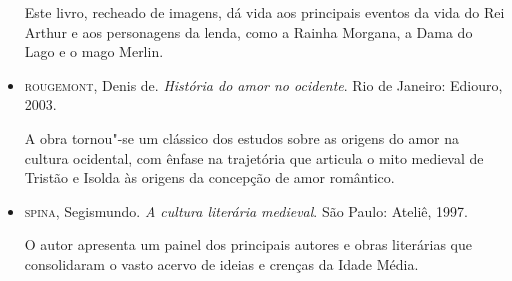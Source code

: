 \documentclass[11pt]{extarticle}
\begin{document}
\begin{itemize}
Este livro, recheado de imagens, dá vida aos principais eventos da
vida do Rei Arthur e aos personagens da lenda, como a Rainha Morgana,
a Dama do Lago e o mago Merlin.

\item \textsc{rougemont}, Denis de. \textit{História do amor no ocidente}. Rio de
Janeiro: Ediouro, 2003.

A obra tornou"-se um clássico dos estudos sobre as origens do amor na
cultura ocidental, com ênfase na trajetória que articula o mito
medieval de Tristão e Isolda às origens da concepção de amor
romântico.

\item \textsc{spina}, Segismundo. \textit{A cultura literária medieval}. São Paulo:
Ateliê, 1997.

O autor apresenta um painel dos principais autores e obras literárias
que consolidaram o vasto acervo de ideias e crenças da Idade Média.
\end{itemize}
\end{document}
